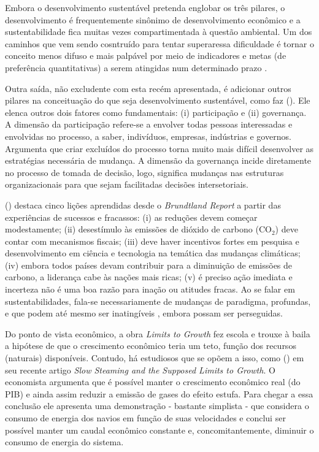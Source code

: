 Embora o desenvolvimento sustentável pretenda englobar os três pilares, o desenvolvimento é frequentemente sinônimo de desenvolvimento econômico e a sustentabilidade fica muitas vezes compartimentada à questão ambiental\cite{ONU2010}. Um dos caminhos que vem sendo cosntruído para tentar superaressa dificuldade é tornar o conceito menos difuso e mais palpável por meio de indicadores \cite{CHAMBERS2000,BOULANGER2008,BARRETT2010,FORTES2012} e metas (de preferência quantitativas) a serem atingidas num determinado prazo \cite{ONU2010,ONU2014}.

Outra saída, não excludente com esta recém apresentada, é adicionar outros pilares na conceituação do que seja desenvolvimento sustentável, como faz 
(\citeyear{BANISTER2005}). Ele elenca outros dois fatores como fundamentais: (i) participação e (ii) governança. A dimensão da participação refere-se a envolver todas pessoas interessadas e envolvidas no processo, a saber, indivíduos, empresas, indústrias e governos. Argumenta que criar excluídos do processo torna muito mais difícil desenvolver as estratégias necessária de mudança. A dimensão da governança incide diretamente no processo de tomada de decisão, logo, significa mudanças nas estruturas organizacionais para que sejam facilitadas decisões intersetoriais.

(\citeyear{BANISTER2005}) destaca cinco lições aprendidas desde o \emph{Brundtland Report} a partir das experiências de sucessos e fracassos: (i) as reduções devem começar modestamente; (ii) desestímulo às emissões de dióxido de carbono (CO$_2$) deve contar com mecanismos fiscais; (iii) deve haver incentivos fortes em pesquisa e desenvolvimento em ciência e tecnologia na temática das mudanças climáticas; (iv) embora todos países devam contribuir para a diminuição de emissões de carbono, a liderança cabe às nações mais ricas; (v) é preciso ação imediata e incerteza não é uma boa razão para inação ou atitudes fracas.
Ao se falar em sustentabilidades, fala-se necessariamente de mudanças de paradigma, profundas, e que podem até mesmo ser inatingíveis \cite{GLASBY2002}, embora possam ser perseguidas.

Do ponto de vista econômico, a obra \emph{Limits to Growth} fez escola e trouxe à baila a hipótese de que o crescimento econômico teria um teto, função dos recursos (naturais) disponíveis. Contudo, há estudiosos que se opõem a isso, como (\citeyear{KRUGMAN2014}) em seu recente artigo \emph{Slow Steaming and the Supposed Limits to Growth}. O economista argumenta que é possível manter o crescimento econômico real (do PIB) e ainda assim reduzir a emissão de gases do efeito estufa. Para chegar a essa conclusão ele apresenta uma demonstração - bastante simplista - que considera o consumo de energia dos navios em função de suas velocidades e conclui ser possível manter um caudal econômico constante e, concomitantemente, diminuir o consumo de energia do sistema.


